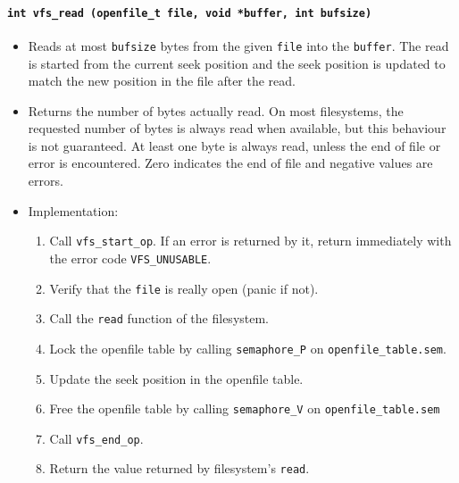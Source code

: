\documentclass[twoside,a4paper]{report}
\makeatletter
\newenvironment{function}[3]{%
\paragraph{\texttt{#1 {\textbf{#2}} (#3)}}%
\index{#2@\texttt{#2}}%
\begin{itemize}%
}{%
\end{itemize}%
}
\makeatother
\begin{document}
\begin{function}{int}{vfs\_read}{openfile\_t file, void *buffer,
int bufsize}

\item Reads at most \texttt{bufsize} bytes from the given
\texttt{file} into the \texttt{buffer}. The read is started from the current
seek position and the seek position is updated to match the new position in the file after the read.

\item Returns the number of bytes actually read. On most filesystems,
the requested number of bytes is always read when available, but this
behaviour is not guaranteed. At least one byte is always read, unless
the end of file or error is encountered. Zero indicates the end of
file and negative values are errors.

\item Implementation:
\begin{enumerate}

\item Call \texttt{vfs\_start\_op}. If an error is returned by it,
 return immediately with the error code \texttt{VFS\_UNUSABLE}.

\item Verify that the \texttt{file} is really open (panic if not).

\item Call the \texttt{read} function of the filesystem.

\item Lock the openfile table by calling \texttt{semaphore\_P} on
\texttt{openfile\_table.sem}.

\item Update the seek position in the openfile table.

\item Free the openfile table by calling \texttt{semaphore\_V} on
\texttt{openfile\_table.sem}

\item Call \texttt{vfs\_end\_op}.

\item Return the value returned by filesystem's \texttt{read}.

\end{enumerate}
\end{function}
\end{document}
